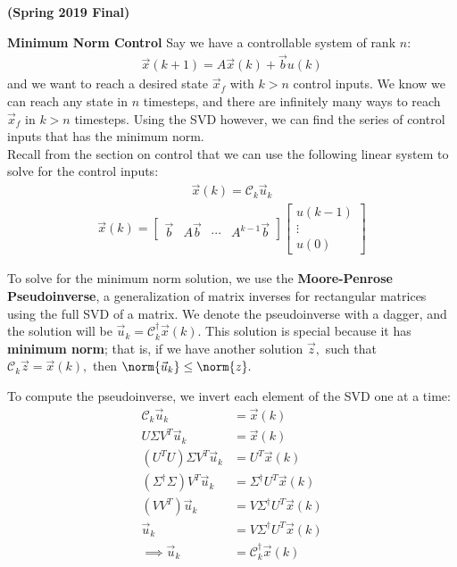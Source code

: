  {\bfseries (Spring 2019 Final)}

\textbf{Minimum Norm Control}
Say we have a controllable system of rank $n$:
\begin{align*}
    \vec{x}(k + 1) = A\vec{x}(k) + \vec{b}u(k)
\end{align*}
 and we want to reach a desired state $\vec{x}_f$ with $k > n$ control inputs. We know we can reach any state in $n$ timesteps, and there are infinitely many ways to reach $\vec{x}_f$ in $k > n$ timesteps. Using the SVD however, we can find the series of control inputs that has the minimum norm. \\
 \newline
 Recall from the section on control that we can use the following linear system to solve for the control inputs:
 \begin{align*}
    \vec{x}(k) = \mathcal{C}_k \vec{u}_k
\end{align*}
\begin{align*}
    \vec{x}(k) = \begin{bmatrix}
        \vec{b} & A\vec{b} & \cdots & A^{k - 1} \vec{b}
    \end{bmatrix} \begin{bmatrix}
        u(k - 1) \\ \vdots \\ u(0)
    \end{bmatrix}
 \end{align*}

To solve for the minimum norm solution, we use the \textbf{Moore-Penrose Pseudoinverse}, a generalization of matrix inverses for rectangular matrices using the full SVD of a matrix. We denote the pseudoinverse with a dagger, and the solution will be $\vec{u}_k = \mathcal{C}_k^{\dagger} \vec{x}(k).$
This solution is special because it has \textbf{minimum norm}; that is, if we have another solution $\vec{z},$ such that $\mathcal{C}_k \vec{z} = \vec{x}(k),$ then $\norm{\vec{u}_k} \leq \norm{z}.$

To compute the pseudoinverse, we invert each element of the SVD one at a time:
\begin{align*}
    \mathcal{C}_k \vec{u}_k &= \vec{x}(k) \\
    U \Sigma V^T \vec{u}_k &= \vec{x}(k)\\
    (U^T U) \Sigma V^T \vec{u}_k &= U^T \vec{x}(k) \\
    (\Sigma^{\dagger} \Sigma) V^T \vec{u}_k &= \Sigma^{\dagger} U^T \vec{x}(k) \\
    (V V^T) \vec{u}_k &= V \Sigma^{\dagger} U^T \vec{x}(k) \\
    \vec{u}_k &= V \Sigma^{\dagger} U^T \vec{x}(k) \\
    \implies \vec{u}_k &= \mathcal{C}_k^{\dagger} \vec{x}(k)
\end{align*}

